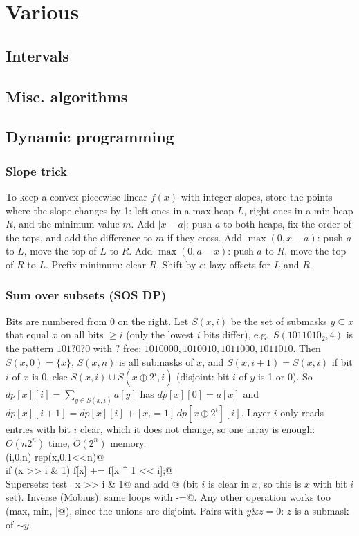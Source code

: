\chapter{Various}

\section{Intervals}

\section{Misc. algorithms}

\section{Dynamic programming}
	\subsection{Slope trick}
		To keep a convex piecewise-linear $f(x)$ with integer slopes, store the points where the slope changes by 1: left ones in a max-heap $L$, right ones in a min-heap $R$, and the minimum value $m$.
		Add $|x - a|$: push $a$ to both heaps, fix the order of the tops, and add the difference to $m$ if they cross.
		Add $\max(0, x - a)$: push $a$ to $L$, move the top of $L$ to $R$.
		Add $\max(0, a - x)$: push $a$ to $R$, move the top of $R$ to $L$.
		Prefix minimum: clear $R$. Shift by $c$: lazy offsets for $L$ and $R$.
	\subsection{Sum over subsets (SOS DP)}
		Bits are numbered from 0 on the right. Let $S(x,i)$ be the set of submasks $y \subseteq x$ that equal $x$ on all bits $\ge i$ (only the lowest $i$ bits differ),
		e.g.\ $S(1011010_2, 4)$ is the pattern $101?0?0$ with $?$ free: $1010000,1010010,1011000,1011010$.
		Then $S(x,0) = \{x\}$, $S(x,n)$ is all submasks of $x$, and
		$S(x,i+1) = S(x,i)$ if bit $i$ of $x$ is 0, else $S(x,i) \cup S(x \oplus 2^i,i)$ (disjoint: bit $i$ of $y$ is 1 or 0).
		So $dp[x][i] = \sum_{y \in S(x,i)} a[y]$ has $dp[x][0] = a[x]$ and $dp[x][i+1] = dp[x][i] + [x_i = 1]\, dp[x \oplus 2^i][i]$.
		Layer $i$ only reads entries with bit $i$ clear, which it does not change, so one array is enough: $O(n 2^n)$ time, $O(2^n)$ memory.
		\\ \verb@rep(i,0,n) rep(x,0,1<<n)@ \\ \verb@  if (x >> i & 1) f[x] += f[x ^ 1 << i];@ \\
		Supersets: test \verb@~x >> i & 1@ and add \verb@f[x ^ 1 << i]@ (bit $i$ is clear in $x$, so this is $x$ with bit $i$ set). Inverse (Mobius): same loops with \verb@-=@.
		Any other operation works too (max, min, \verb@|@), since the unions are disjoint.
		Pairs with $y \mathbin{\&} z = 0$: $z$ is a submask of $\sim y$.
